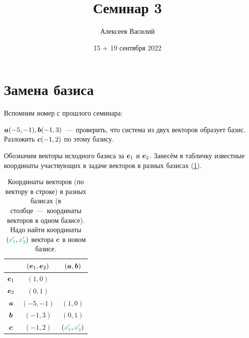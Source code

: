 \documentclass[a4paper,12pt]{article}
\author{Алексеев Василий}
\title{Семинар 3}
\date{15 + 19 сентября 2022}
\begin{document}
  \maketitle
  
  \tableofcontents

  \thispagestyle{empty}
  
  \newpage
  


  \section{Замена базиса}
  
  Вспомним номер с прошлого семинара:
  \begin{problem}[1.6]
    $\boldsymbol a(-5, -1), \boldsymbol b(-1, 3)$~---~проверить, что система из двух векторов образует базис.
    Разложить $\boldsymbol c(-1, 2)$ по этому базису.
  \end{problem}
  
  \begin{solution}
    Обозначим векторы исходного базиса за $\boldsymbol e_1$ и $\boldsymbol e_2$.
    Занесём в табличку известные координаты участвующих в задаче векторов в разных базисах (\ref{fig:different-basises}).
    
    \begin{table}[h]
      \centering
    
      \caption{Координаты векторов (по вектору в строке) в разных базисах (в столбце~---~координаты векторов в одном базисе). Надо найти координаты $(\textcolor{my-cyan}{x_1'}, \textcolor{my-cyan}{x_2'})$ вектора $\boldsymbol c$ в новом базисе.}
      \label{fig:different-basises}
      
      \begin{tabular}{c|cc}
        \toprule
        {}          & $(\boldsymbol e_1, \boldsymbol e_2)$ & $(\boldsymbol a, \boldsymbol b)$\\
        \midrule
        $\boldsymbol e_1$  & $(1, 0)$    & ${}$\\
        $\boldsymbol e_2$  & $(0, 1)$    & ${}$\\
        \midrule
        $\boldsymbol a$    & $(-5, -1)$  & $(1, 0)$\\
        $\boldsymbol b$    & $(-1, 3)$   & $(0, 1)$\\
        \midrule
        $\boldsymbol c$    & $(-1, 2)$   & $(\textcolor{my-cyan}{x_1'}, \textcolor{my-cyan}{x_2'})$\\
        \bottomrule
      \end{tabular}
    \end{table}
  \end{solution}
  
\end{document}
